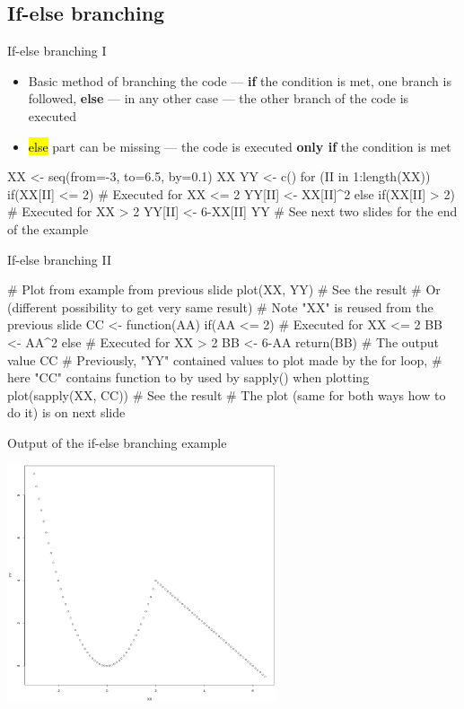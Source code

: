 \documentclass[compress, ucs, xelatex, 11pt, xcolor=svgnames,
  hyperref={
    bookmarks=true,
    unicode=true,
    colorlinks=true,
    pdftitle={Molecular data in R},
    plainpages=false,
    pdfauthor={Vojtech Zeisek},
    pdfsubject={Course about phylogeny and evolution in R},
    pdfcreator={XeLaTeX},
    pdfkeywords={R, evolution, phylogeny, molecular data},
    linkcolor=Tomato,
    anchorcolor=SaddleBrown,
    citecolor=Goldenrod,
    filecolor=DarkMagenta,
    menucolor=Sienna,
    urlcolor=DarkTurquoise,
    pdftex},
  url={hyphens, lowtilde} %
  ]{beamer}
\renewcommand{\texttt}[1]{\hl{\ttfamily #1}}
\begin{document}
\subsection{If-else branching}

\begin{frame}[fragile]{If-else branching I}
  \begin{itemize}
    \item Basic method of branching the code --- \textbf{if} the condition is met, one branch is followed, \textbf{else} --- in any other case --- the other branch of the code is executed
    \item \texttt{else} part can be missing --- the code is executed \textbf{only if} the condition is met
  \end{itemize}
  \begin{spluscode}
    XX <- seq(from=-3, to=6.5, by=0.1)
    XX
    YY <- c()
    for (II in 1:length(XX)) {
      if(XX[II] <= 2) { # Executed for XX <= 2
        YY[II] <- XX[II]^2
        } else if(XX[II] > 2) { # Executed for XX > 2
          YY[II] <- 6-XX[II]
          }
      }
    YY # See next two slides for the end of the example
  \end{spluscode}
\end{frame}

\begin{frame}[fragile]{If-else branching II}
  \begin{spluscode}
    # Plot from example from previous slide
    plot(XX, YY) # See the result
    # Or (different possibility to get very same result)
    # Note "XX" is reused from the previous slide
    CC <- function(AA) {
      if(AA <= 2) { # Executed for XX <= 2
      BB <- AA^2
      } else { # Executed for XX > 2
        BB <- 6-AA
        }
      return(BB) # The output value
      }
     CC # Previously, "YY" contained values to plot made by the for loop,
        # here "CC" contains function to by used by sapply() when plotting
     plot(sapply(XX, CC)) # See the result
    # The plot (same for both ways how to do it) is on next slide
  \end{spluscode}
\end{frame}

\begin{frame}{Output of the if-else branching example}
  \begin{center}
    \includegraphics[height=7cm]{if-else.png}
  \end{center}
\end{frame}
\end{document}
